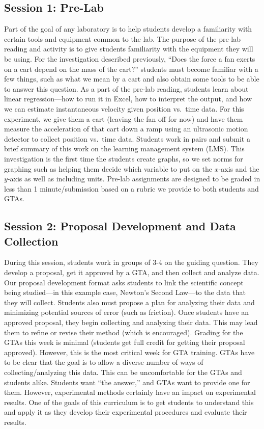 \documentclass[aip, numerical, preprint]{revtex4-2}
\begin{document}
\subsection{Session 1: Pre-Lab}
Part of the goal of any laboratory is to help students develop a familiarity with certain tools
and equipment common to the lab.  The purpose of the pre-lab reading and activity is to give
students familiarity with the equipment they will be using.  For the investigation described
previously, ``Does the force a fan exerts on a cart depend on the mass of the cart?''  students 
must become familiar with a few things, such as what we mean by a cart and also obtain some 
tools to be able to answer this question.  As a part of the pre-lab
reading, students learn about linear regression---how to run it in Excel,
how to interpret the output, and how we can estimate instantaneous velocity given position
vs.\ time data. For this experiment, we give them a cart (leaving the fan off for now) and have
them measure the acceleration of that cart down a ramp using an ultrasonic motion detector to
collect position vs.\ time data.  Students work in pairs and submit a brief
summary of this work on the learning management system (LMS). This investigation is the first
time the students create graphs, so we set norms for graphing such as helping them decide which
variable to put on the $x$-axis and the $y$-axis as well as including units.  Pre-lab assignments
are designed to be graded in less than 1 minute/submission based on a rubric we provide to both
students and GTAs.

\subsection{Session 2: Proposal Development and Data Collection}
During this session, students work in groups of 3-4 on the guiding question.  They develop a
proposal, get it approved by a GTA, and then collect and analyze data.  Our proposal development 
format asks students to link the scientific concept being studied---in
this example case, Newton's Second Law---to the data that they will collect.  Students also
must propose a plan for analyzing their data and minimizing potential sources of error (such
as friction).  Once students have an approved proposal, they begin collecting and analyzing
their data.  This may lead them to refine or revise their method (which is encouraged).  Grading 
for the GTAs this week is minimal (students get full credit for getting their
proposal approved).  However, this is the most critical week for GTA training.  GTAs have to be
clear that the goal is to allow a diverse number of ways of collecting/analyzing this
data. This can be uncomfortable for the GTAs and students alike.  Students want ``the answer,''
and GTAs want to provide one for them.  However, experimental methods certainly have an impact
on experimental results. One of the goals of this curriculum is to get students to understand
this and apply it as they develop their experimental procedures and evaluate their results.
\end{document}
